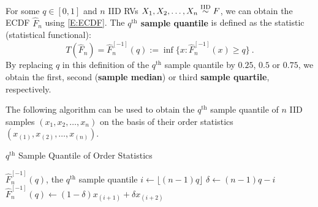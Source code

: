 \begin{definition}
For some $q \in [0,1]$ and $n$ IID RVs $X_1,X_2,\ldots,X_n \overset{{\rm IID}}{\sim} F$, we can obtain the ECDF $\widehat{F}_n$ using \eqref{E:ECDF}.  The {\bf $q^{\text{th}}$ sample quantile} is defined as the statistic (statistical functional):
\begin{equation}\label{E:qthSampleQuantile}
T(\widehat{F}_n) = \widehat{F}_n^{[-1]}(q) := \inf{ \{ x:  \widehat{F}_n^{[-1]}(x) \geq q \} } \ .
\end{equation}
By replacing $q$ in this definition of the $q^{\text{th}}$ sample quantile by $0.25$, $0.5$ or $0.75$, we obtain the first, second ({\bf sample median}) or third {\bf sample quartile}, respectively.
\end{definition}

The following algorithm can be used to obtain the $q^{\text{th}}$ sample quantile of $n$ IID samples $(x_1,x_2,\ldots,x_n)$ on the basis of their order statistics $(x_{(1)},x_{(2)},\ldots,x_{(n)})$.
\begin{algorithm}
\caption{$q^{\text{th}}$ Sample Quantile of Order Statistics}
\label{A:qthSampleQuantile}
\begin{algorithmic}[1]
 $ \widehat{F}_n^{[-1]}(q)$, the $q^{\text{th}}$ sample quantile
\STATE $i \gets \lfloor (n-1) q \rfloor$
\STATE $\delta \gets (n-1) q - i$
\ELSE
\STATE $ \widehat{F}_n^{[-1]}(q) \gets (1 - \delta) x_{(i+1)} + \delta x_{(i+2)}$
\ENDIF
{}
\end{algorithmic}
\end{algorithm}

